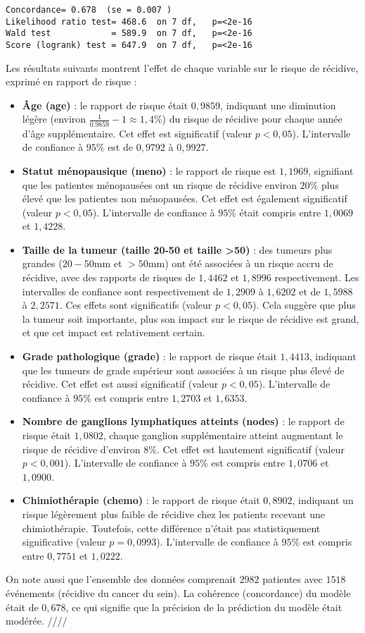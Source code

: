 \documentclass[../main.tex]{subfiles}
\begin{document}
\begin{CJK*}{UTF8}{gbsn}
\begin{lstlisting}
Concordance= 0.678  (se = 0.007 )
Likelihood ratio test= 468.6  on 7 df,   p=<2e-16
Wald test            = 589.9  on 7 df,   p=<2e-16
Score (logrank) test = 647.9  on 7 df,   p=<2e-16
\end{lstlisting}

Les résultats suivants montrent l'effet de chaque variable sur le risque de récidive, 
exprimé en rapport de risque :

\begin{itemize}
    \item \textbf{Âge (age)} : le rapport de risque était $0,9859$, 
indiquant une diminution légère (environ $\frac{1}{0.9859} - 1 \approx 1,4\%$) du risque de récidive 
pour chaque année d'âge supplémentaire. Cet effet est significatif 
(valeur \( p < 0,05 \)). L'intervalle de confiance à $95 \%$ est de $0,9792$ à $0,9927$.
    \item \textbf{Statut ménopausique (meno)} : 
le rapport de risque est $1,1969$, signifiant 
que les patientes ménopausées ont un risque de récidive environ 
$20\%$ plus élevé que les patientes non ménopausées. 
Cet effet est également significatif (valeur \( p < 0,05 \)). 
L'intervalle de confiance à $95 \%$ était compris entre $1,0069$ et $1,4228$.
    \item \textbf{Taille de la tumeur (taille 20-50 et taille >50)} : 
des tumeurs plus grandes ($20-50 \text{mm}$ et $> 50 \text{mm}$) 
ont été associées à un risque accru de récidive, 
avec des rapports de risques de $1,4462$ et $1,8996$ respectivement. 
Les intervalles de confiance sont respectivement de $1,2909$ à $1,6202$ et de $1,5988$ à $2,2571$. 
Ces effets sont significatifs (valeur \( p < 0,05 \)). 
Cela suggère que plus la tumeur soit importante, 
plus son impact sur le risque de récidive est grand, 
et que cet impact est relativement certain.
    \item \textbf{Grade pathologique (grade)} : 
le rapport de risque était $1,4413$, 
indiquant que les tumeurs de grade supérieur 
sont associées à un risque plus élevé de récidive. 
Cet effet est aussi significatif (valeur \( p < 0,05 \)). 
L'intervalle de confiance à $95 \%$ est compris entre $1,2703$ et $1,6353$.
    \item \textbf{Nombre de ganglions lymphatiques atteints (nodes)} : 
le rapport de risque était $1,0802$, 
chaque ganglion supplémentaire atteint augmentant le risque de récidive d'environ $8\%$. 
Cet effet est hautement significatif (valeur \( p < 0,001 \)). 
L'intervalle de confiance à $95 \%$ est compris entre $1,0706$ et $1,0900$.
    \item \textbf{Chimiothérapie (chemo)} : 
le rapport de risque était $0,8902$, 
indiquant un risque légèrement plus faible de récidive 
chez les patients recevant une chimiothérapie. 
Toutefois, cette différence n'était pas statistiquement significative (valeur \( p = 0,0993 \)). 
L'intervalle de confiance à $95 \%$ est compris entre $0,7751$ et $1,0222$.
\end{itemize}

On note aussi que l'ensemble des données comprenait $2982$ patientes avec $1518$ événements 
(récidive du cancer du sein). La cohérence (concordance) du modèle était de $0,678$, 
ce qui signifie que la précision de la prédiction du modèle était modérée. ////
\end{CJK*}
\end{document}
